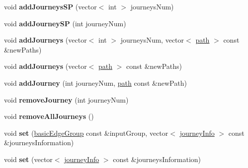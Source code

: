 \begin{DoxyCompactItemize}
\item 
\hypertarget{classgraphGroup_a64523ed65823a8fabaa15fb8f1263674}{
void {\bfseries addJourneysSP} (vector$<$ int $>$ journeysNum)}
\label{classgraphGroup_a64523ed65823a8fabaa15fb8f1263674}

\item 
\hypertarget{classgraphGroup_ac50aef9d023f90cb5561350e77357463}{
void {\bfseries addJourneySP} (int journeyNum)}
\label{classgraphGroup_ac50aef9d023f90cb5561350e77357463}

\item 
\hypertarget{classgraphGroup_a73c9df8bad6e86c7c5cc02c081da185c}{
void {\bfseries addJourneys} (vector$<$ int $>$ journeysNum, vector$<$ \hyperlink{classpath}{path} $>$ const \&newPaths)}
\label{classgraphGroup_a73c9df8bad6e86c7c5cc02c081da185c}

\item 
\hypertarget{classgraphGroup_a685c837aa1e65b821d12f2b145715736}{
void {\bfseries addJourneys} (vector$<$ \hyperlink{classpath}{path} $>$ const \&newPaths)}
\label{classgraphGroup_a685c837aa1e65b821d12f2b145715736}

\item 
\hypertarget{classgraphGroup_a4fd7cba1777e3165e9f805ddd47cb4a1}{
void {\bfseries addJourney} (int journeyNum, \hyperlink{classpath}{path} const \&newPath)}
\label{classgraphGroup_a4fd7cba1777e3165e9f805ddd47cb4a1}

\item 
\hypertarget{classgraphGroup_aa5807705cd8edd59534ae46fb544e519}{
void {\bfseries removeJourney} (int journeyNum)}
\label{classgraphGroup_aa5807705cd8edd59534ae46fb544e519}

\item 
\hypertarget{classgraphGroup_a73f4bc62955fb4bfa88dc8e0ac09aef1}{
void {\bfseries removeAllJourneys} ()}
\label{classgraphGroup_a73f4bc62955fb4bfa88dc8e0ac09aef1}

\item 
\hypertarget{classgraphGroup_acc912cda8d8ea0a9e29288296aaa3ebf}{
void {\bfseries set} (\hyperlink{classbasicEdgeGroup}{basicEdgeGroup} const \&inputGroup, vector$<$ \hyperlink{classjourneyInfo}{journeyInfo} $>$ const \&journeysInformation)}
\label{classgraphGroup_acc912cda8d8ea0a9e29288296aaa3ebf}

\item 
\hypertarget{classgraphGroup_aa95500fefb0e1fc567ae0a8014dfd9fa}{
void {\bfseries set} (vector$<$ \hyperlink{classjourneyInfo}{journeyInfo} $>$ const \&journeysInformation)}
\label{classgraphGroup_aa95500fefb0e1fc567ae0a8014dfd9fa}


\end{DoxyCompactItemize}
